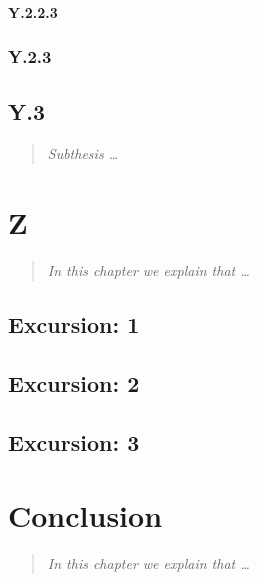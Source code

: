 \documentclass[
  DIV=calc,
  BCOR=5mm,
  11pt,
  headings=small,
  oneside,
  abstract=true,
  toc=bib,
  ngerman,english]{scrbook}
\begin{document}
\subsubsection{Y.2.2.3}

\subsection{Y.2.3}

\section{Y.3}
\begin{quote}\itshape
Subthesis \ldots
\end{quote} 

\chapter{Z}
\begin{quote}\itshape
In this chapter we explain that \ldots
\end{quote}  

\section{Excursion: 1}

\section{Excursion: 2}

\section{Excursion: 3}

\chapter{Conclusion}
\begin{quote}\itshape
In this chapter we explain that \ldots
\end{quote}  


\small




\printnomenclature


\end{document}
